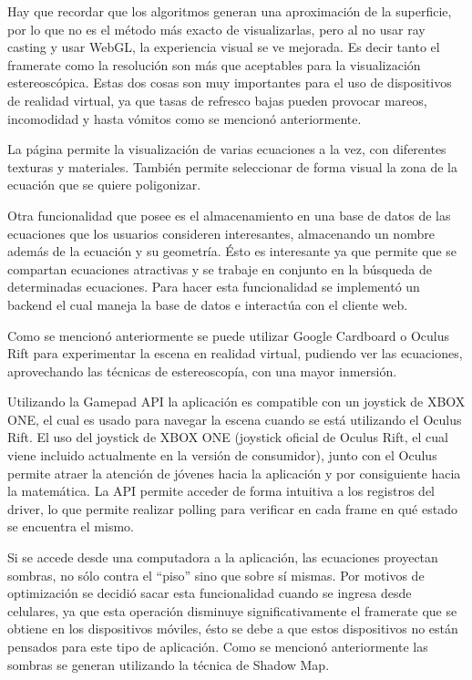 \documentclass[12pt]{article}
\begin{document}
Hay que recordar que los algoritmos generan una aproximación de la superficie, por lo que no es el método más exacto de visualizarlas, pero al no usar ray casting y usar WebGL, la experiencia visual se ve mejorada. Es decir tanto el framerate como la resolución son más que aceptables para la visualización estereoscópica. Estas dos cosas son muy importantes para el uso de dispositivos de realidad virtual, ya que tasas de refresco bajas pueden provocar mareos, incomodidad y hasta vómitos como se mencionó anteriormente.

La página permite la visualización de varias ecuaciones a la vez, con diferentes texturas y materiales. También permite seleccionar de forma visual la zona de la ecuación que se quiere poligonizar.

Otra funcionalidad que posee es el almacenamiento en una base de datos de las ecuaciones que los usuarios consideren interesantes, almacenando un nombre además de la ecuación y su geometría. Ésto es interesante ya que permite que se compartan ecuaciones atractivas y se trabaje en conjunto en la búsqueda de determinadas ecuaciones. Para hacer esta funcionalidad se implementó un backend el cual maneja la base de datos e interactúa con el cliente web.

Como se mencionó anteriormente se puede utilizar Google Cardboard o Oculus Rift para experimentar la escena en realidad virtual, pudiendo ver las ecuaciones, aprovechando las técnicas de estereoscopía, con una mayor inmersión.

Utilizando la Gamepad API\cite{gamepadapi} la aplicación es compatible con un joystick de XBOX ONE, el cual es usado para navegar la escena cuando se está utilizando el Oculus Rift. El uso del joystick de XBOX ONE (joystick oficial de Oculus Rift, el cual viene incluido actualmente en la versión de consumidor), junto con el Oculus permite atraer la atención de jóvenes hacia la aplicación y por consiguiente hacia la matemática. La API permite acceder de forma intuitiva a los registros del driver\cite{engine}, lo que permite realizar polling para verificar en cada frame en qué estado se encuentra el mismo.

Si se accede desde una computadora a la aplicación, las ecuaciones proyectan sombras, no sólo contra el “piso” sino que sobre sí mismas. Por motivos de optimización se decidió sacar esta funcionalidad cuando se ingresa desde celulares, ya que esta operación disminuye significativamente el framerate que se obtiene en los dispositivos móviles, ésto se debe a que estos dispositivos no están pensados para este tipo de aplicación. Como se mencionó anteriormente las sombras se generan utilizando la técnica de Shadow Map\cite{shadowmap}\cite{realtimerendering}.
\end{document}

